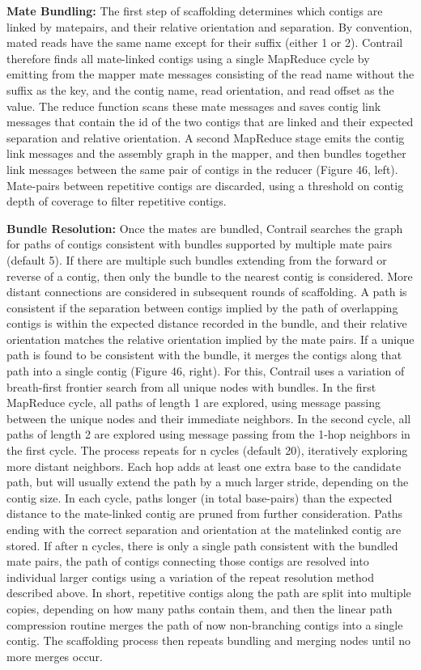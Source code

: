 \documentclass[conference]{IEEEtran}
\begin{document}
\textbf{Mate Bundling:}
The first step of scaffolding determines which contigs are linked by matepairs, and their relative orientation and separation. By convention, mated reads have the same name except for their suffix (either 1 or 2). Contrail therefore finds all mate-linked contigs using a single MapReduce cycle by emitting from the mapper mate messages consisting of the read name without the suffix as the key, and the contig name, read orientation, and read offset as the value. The reduce function scans these mate messages and saves contig link messages that contain the id of the two contigs that are linked and their expected separation and relative orientation. A second MapReduce stage emits the contig link messages and the assembly graph in the mapper, and then bundles together link messages between the same pair of contigs in the reducer (Figure 46, left). Mate-pairs between repetitive contigs are discarded, using a threshold on contig depth of coverage to filter repetitive contigs.

\textbf{Bundle Resolution:}
Once the mates are bundled, Contrail searches the graph for paths of contigs consistent with bundles supported by multiple mate pairs (default 5). If there are multiple such bundles extending from the forward or reverse of a contig, then only the bundle to the nearest contig is considered. More distant connections are considered in subsequent rounds of scaffolding. A path is consistent if the separation between contigs implied by the path of overlapping contigs is within the expected distance recorded in the bundle, and their relative orientation matches the relative orientation implied by the mate pairs. If a unique path is found to be consistent with
the bundle, it merges the contigs along that path into a single contig (Figure 46, right).  For this, Contrail uses a variation of breath-first frontier search from all unique nodes with bundles. In the first MapReduce cycle, all paths of length 1 are explored, using message passing between the unique nodes and their immediate neighbors. In the second cycle, all paths of length 2 are explored using message passing from the 1-hop neighbors in the first cycle. The process repeats for n cycles (default 20), iteratively exploring more distant neighbors. Each hop adds at least one extra base to the candidate path, but will usually extend the path by a much larger
stride, depending on the contig size. In each cycle, paths longer (in total base-pairs) than the expected distance to the mate-linked contig are pruned from further consideration. Paths ending with the correct separation and orientation at the matelinked contig are stored. If after n cycles, there is only a single path consistent with the bundled mate pairs, the path of contigs connecting those contigs are resolved into individual larger contigs using a variation of the repeat resolution method described above. In short, repetitive contigs along the path are split into multiple copies, depending on how many paths contain them, and then the linear path compression
routine merges the path of now non-branching contigs into a single contig. The scaffolding process then repeats bundling and merging nodes until no more merges occur.
\end{document}
